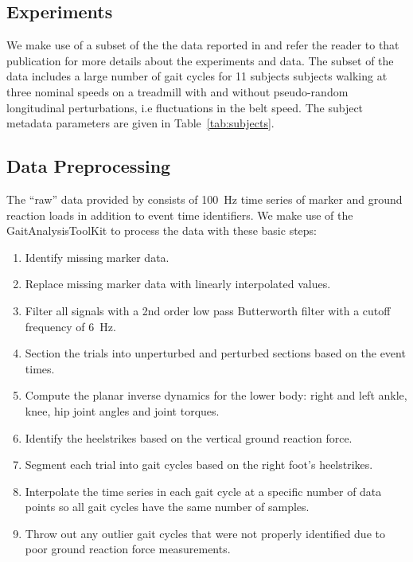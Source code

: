 \documentclass{article}
\begin{document}
\subsection*{Experiments}
%
We make use of a subset of the the data reported in \cite{Moore2015} and refer
the reader to that publication for more details about the experiments and data.
The subset of the data includes a large number of gait cycles for 11 subjects
subjects walking at three nominal speeds on a treadmill with and without
pseudo-random longitudinal perturbations, i.e fluctuations in the belt speed.
The subject metadata parameters are given in Table~\ref{tab:subjects}.
%
\begin{table}
  \cprotect\caption{Information about the 11 study participants. The final
    three columns provide the trial numbers associated with each nominal
    treadmill speed. The measured mass is computed from the mean total vertical
    ground reaction force just after the calibration pose event. Generated by
    \verb|src/subject_table.py|.}
  \centering
  
  \label{tab:subjects}
\end{table}

\subsection*{Data Preprocessing}
%
The ``raw'' data provided by \cite{Moore2015} consists of 100~\si{\hertz} time
series of marker and ground reaction loads in addition to event time
identifiers. We make use of the GaitAnalysisToolKit to process the data with
these basic steps:
%
\begin{enumerate}
  \item Identify missing marker data.
  \item Replace missing marker data with linearly interpolated values.
  \item Filter all signals with a 2nd order low pass Butterworth filter with a
    cutoff frequency of 6~\si{\hertz}.
  \item Section the trials into unperturbed and perturbed sections based on the
    event times.
  \item Compute the planar inverse dynamics for the lower body: right and left
    ankle, knee, hip joint angles and joint torques.
  \item Identify the heelstrikes based on the vertical ground reaction force.
  \item Segment each trial into gait cycles based on the right foot's
    heelstrikes.
  \item Interpolate the time series in each gait cycle at a specific number of
    data points so all gait cycles have the same number of samples.
  \item Throw out any outlier gait cycles that were not properly identified due
    to poor ground reaction force measurements.
\end{enumerate}
\end{document}
